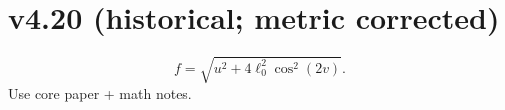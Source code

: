 \documentclass[11pt]{article}
\begin{document}
\section*{v4.20 (historical; metric corrected)}
\[
f=\sqrt{u^2+4\ell_0^2\cos^2(2v)}.
\]
Use core paper + math notes.
\end{document}
